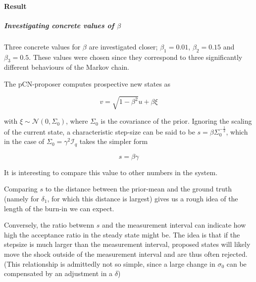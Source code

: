 \documentclass[11pt]{article}
\newcommand{\I}{{\mathcal{I}}}
\newcommand{\N}[2]{\mathcal{N}\left(#1,#2\right)}
\begin{document}
\paragraph{Result}
\label{sec:org0a28ebe}

\subparagraph{Investigating concrete values of \(\beta\)}
\label{sec:org7b9fd5a}

Three concrete values for \(\beta\) are investigated closer; \(\beta_1 = 0.01\), \(\beta_2 = 0.15\)
and \(\beta_3 = 0.5\). These values were chosen since they correspond to three significantly
different behaviours of the Markov chain.

The pCN-proposer computes prospective new states as

$$v = \sqrt{1-\beta^2} u + \beta \xi$$

with \(\xi \sim \N{0}{\Sigma_0}\), where \(\Sigma_0\) is the covariance of the prior. Ignoring the
scaling of the current state, a characteristic step-size can be said to be \(s = \beta \Sigma_0^{-\frac{1}{2}}\),
which in the case of \(\Sigma_0 = \gamma^2 \I_q\) takes the simpler form

\begin{equation}
\label{eqn:char_step}
  s = \beta \gamma
\end{equation}

It is interesting to compare this value to other numbers in the system.

Comparing \(s\) to the distance between the prior-mean and the ground truth (namely for \(\delta_{\text{1}}\),
for which this distance is largest) gives us a rough idea of the length of the burn-in we
can expect.

Conversely, the ratio betwenn \(s\) and the measurement interval can indicate how high the acceptance
ratio in the steady state might be.
The idea is that if the stepsize is much larger than the measurement interval, proposed states will
likely move the shock outside of the measurement interval and are thus often rejected. (This
relationship is admittedly not so simple, since a large change in \(\sigma_{\text{0}}\) can be compensated
by an adjustment in a \(\delta\))
\end{document}
